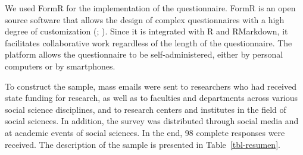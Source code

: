 \documentclass[
  letterpaper,
]{article}
\begin{document}
We used FormR for the implementation of the questionnaire. FormR is an
open source software that allows the design of complex questionnaires
with a high degree of customization
(;
). Since
it is integrated with R and RMarkdown, it facilitates collaborative work
regardless of the length of the questionnaire. The platform allows the
questionnaire to be self-administered, either by personal computers or
by smartphones.

To construct the sample, mass emails were sent to researchers who had
received state funding for research, as well as to faculties and
departments across various social science disciplines, and to research
centers and institutes in the field of social sciences. In addition, the
survey was distributed through social media and at academic events of
social sciences. In the end, 98 complete responses were received. The
description of the sample is presented in Table~\ref{tbl-resumen}.
\end{document}
